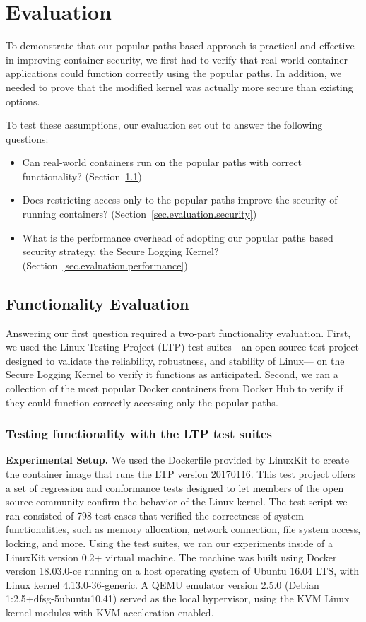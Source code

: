 \section{Evaluation}
\label{sec.evaluation}
To demonstrate that our popular paths based approach is practical and effective in improving container security, 
we first had to verify that real-world container applications could function correctly using the popular paths. 
In addition, we needed to prove that the modified kernel was actually more secure than existing options. 

To test these assumptions, our evaluation set out to answer the following questions:
\begin{itemize}
\item Can real-world containers run on the popular paths with correct functionality? (Section~{\ref{sec.evaluation.functionality}})
\item Does restricting access only to the popular paths improve the security of running containers? (Section~{\ref{sec.evaluation.security}})
\item What is the performance overhead of adopting our popular paths based security strategy, the Secure Logging Kernel? (Section~{\ref{sec.evaluation.performance}})
\end{itemize}

\subsection{Functionality Evaluation}
\label{sec.evaluation.functionality} 
Answering our first question required a two-part functionality evaluation. 
First, we used the Linux Testing Project (LTP) \cite{LTP} test suites—an open source test project designed to validate the reliability, robustness, and stability of Linux—
on the Secure Logging Kernel to verify it functions as anticipated. 
Second, we ran a collection of the most popular Docker containers from Docker Hub to verify if they could function correctly accessing only the popular paths.

\subsubsection{Testing functionality with the LTP test suites}
\label{sec.evaluation.functionality.ltp} 
\textbf{Experimental Setup.}
We used the Dockerfile provided by LinuxKit \cite{LinuxKit} to create the container image that runs the LTP version 20170116. 
This test project offers a set of regression and conformance tests designed to let members of the open source community confirm the behavior of the Linux kernel. 
The test script we ran consisted of 798 test cases that verified the correctness of system functionalities, 
such as memory allocation, network connection, file system access, locking, and more. 
Using the test suites, we ran our experiments inside of a LinuxKit version 0.2+ virtual machine. 
The machine was built using Docker version 18.03.0-ce running on a host operating system of Ubuntu 16.04 LTS, with Linux kernel 4.13.0-36-generic. 
A QEMU emulator version 2.5.0 (Debian 1:2.5+dfsg-5ubuntu10.41) served as the local hypervisor, using the KVM Linux kernel modules with KVM acceleration enabled.  

